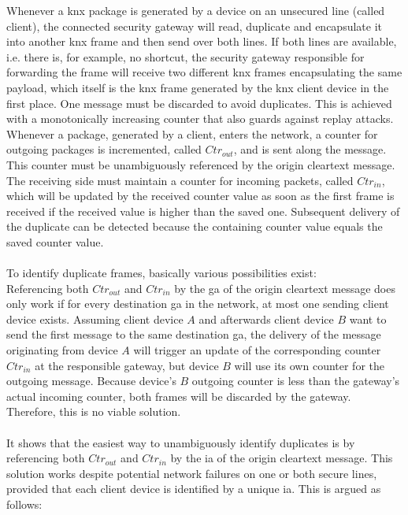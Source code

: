 Whenever a \gls{knx} package is
generated by a device on an unsecured line (called client), the connected security gateway will read, duplicate and encapsulate it into another \gls{knx} frame 
and then send over both lines. If both lines are available, i.e. there is, for example, no shortcut, the security gateway responsible for forwarding the frame
will receive two different \gls{knx} frames encapsulating the same
payload, which itself is the \gls{knx} frame generated by the \gls{knx} client device in the first place. 
One message must be discarded to avoid duplicates. 
This is achieved with a monotonically increasing counter that also guards against replay attacks. Whenever a package, generated by a client, enters the
network, a counter for outgoing packages is incremented, called $Ctr_{out}$, and is sent along the message. 
This counter must be unambiguously referenced by the origin cleartext message. 
The receiving side must maintain a counter for incoming packets, called $Ctr_{in}$, which will be updated by the received counter value
as soon as the first frame is received if the received value is higher than the saved one.
Subsequent delivery of the duplicate can be detected because the containing counter value equals the saved counter value.
\\
\\
To identify duplicate frames, basically various possibilities exist:
\\
Referencing both $Ctr_{out}$ and $Ctr_{in}$ by the \gls{ga} of the origin cleartext message does only work if for every destination
 \gls{ga} in the network, at most one sending client device exists. Assuming client device $A$ and afterwards client device $B$ want to send the first message to
 the same destination \gls{ga}, the delivery of the message
 originating from device $A$ will trigger an update of the corresponding counter $Ctr_{in}$ at the responsible gateway, but device $B$ will use its own counter
 for the outgoing message. Because device's $B$ outgoing counter is less than the gateway's actual incoming counter, both frames will be discarded by the gateway.
Therefore, this is no viable solution.
\\
\\
It shows that the easiest way to unambiguously identify duplicates is by referencing both $Ctr_{out}$ and $Ctr_{in}$ by the \gls{ia} of the origin
cleartext message. This solution works despite potential network failures on one or both secure lines, provided that each client device is identified by a unique
\gls{ia}. This is argued as follows:
